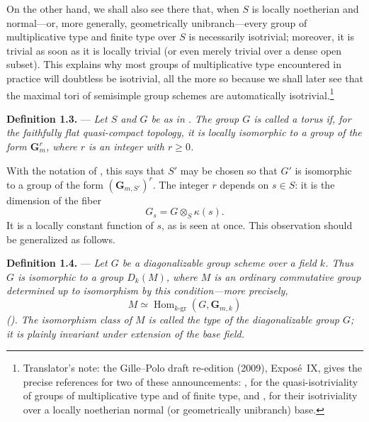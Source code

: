 On the other hand, we shall also see there that, when \(S\) is
locally noetherian and normal---or, more generally, geometrically
unibranch---every group of multiplicative type and finite type over \(S\)
is necessarily isotrivial; moreover, it is trivial as soon as it is
locally trivial (or even merely trivial over a dense open subset). This
explains why most groups of multiplicative type encountered in practice
will doubtless be isotrivial, all the more so because we shall later see
that the maximal tori of semisimple group schemes are automatically
isotrivial.\footnote{Translator's note: the Gille--Polo draft re-edition (2009), Exposé~IX, gives the precise references for two of these announcements: , for the quasi-isotriviality of groups of multiplicative type and of finite type, and , for their isotriviality over a locally noetherian normal (or geometrically unibranch) base.}

\medskip
\noindent{}\textbf{Definition 1.3.} ---
\textit{Let \(S\) and \(G\) be as in
. The group \(G\) is called a
\emph{torus} if, for the faithfully flat quasi-compact topology, it is
locally isomorphic to a group of the form \(\mathbf G_m^r\), where
\(r\) is an integer with \(r\geq 0\).}

With the notation of , this says
that \(S'\) may be chosen so that \(G'\) is isomorphic to a group of the
form \((\mathbf G_{m,S'})^r\). The integer \(r\) depends on \(s\in S\):
it is the dimension of the fiber
\[
  G_s=G\otimes_S\kappa(s).
\]
It is a locally constant function of \(s\), as is seen at once. This
observation should be generalized as follows.

\medskip
\noindent{}\textbf{Definition 1.4.} ---
\textit{Let \(G\) be a diagonalizable group scheme over a field \(k\).
Thus \(G\) is isomorphic to a group \(D_k(M)\), where \(M\) is an ordinary
commutative group determined up to isomorphism by this condition---more
precisely,
\[
  M\simeq\operatorname{Hom}_{k\text{-}\mathrm{gr}}
    (G,\mathbf G_{m,k})
\]
(). The isomorphism class of \(M\) is called the \emph{type} of
the diagonalizable group \(G\); it is plainly invariant under extension
of the base field.}

